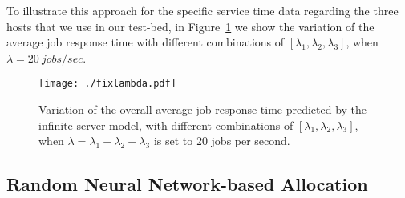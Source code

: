 \documentclass[journal]{IEEEtran}
\begin{document}
To illustrate this approach for the specific service time data regarding the three hosts that we use in our test-bed, 
in Figure~\ref{fig:fixlambda} 
we show the variation of the average job response time with different combinations of $[\lambda_1,\lambda_2,\lambda_3]$,
when  $\lambda=20~jobs/sec$.  
\begin{figure}[ht]
     \centering
      \texttt{[image: ./fixlambda.pdf]} \caption{Variation of the overall average job response time predicted by the infinite server model, with different combinations of $[\lambda_1,\lambda_2,\lambda_3]$, when $\lambda=\lambda_1+\lambda_2+\lambda_3$ is set to 20 jobs per second.}
     \label{fig:fixlambda}
    \end{figure}
		





\subsection{Random Neural Network-based Allocation} \label{RNN}
\end{document}
